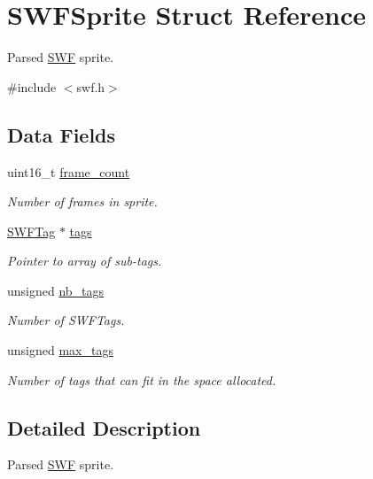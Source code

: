 \hypertarget{struct_s_w_f_sprite}{}\section{S\+W\+F\+Sprite Struct Reference}
\label{struct_s_w_f_sprite}


Parsed \hyperlink{struct_s_w_f}{S\+W\+F} sprite.  




{\ttfamily \#include $<$swf.\+h$>$}

\subsection*{Data Fields}
\begin{DoxyCompactItemize}
\item 
uint16\+\_\+t \hyperlink{struct_s_w_f_sprite_a952578e82c9d1dad81bbb086cb8ec1c2}{frame\+\_\+count}
\begin{DoxyCompactList}\small\item\em Number of frames in sprite. \end{DoxyCompactList}\item 
\hyperlink{struct_s_w_f_tag}{S\+W\+F\+Tag} $\ast$ \hyperlink{struct_s_w_f_sprite_ade3a1182fa49e25d252ade80aac6f873}{tags}
\begin{DoxyCompactList}\small\item\em Pointer to array of sub-\/tags. \end{DoxyCompactList}\item 
unsigned \hyperlink{struct_s_w_f_sprite_a9eae389efaf36d5ebf4e1e31edf2f05e}{nb\+\_\+tags}
\begin{DoxyCompactList}\small\item\em Number of S\+W\+F\+Tags. \end{DoxyCompactList}\item 
unsigned \hyperlink{struct_s_w_f_sprite_a508a2dc2cceb78be54bf2c40a1665236}{max\+\_\+tags}
\begin{DoxyCompactList}\small\item\em Number of tags that can fit in the space allocated. \end{DoxyCompactList}\end{DoxyCompactItemize}


\subsection{Detailed Description}
Parsed \hyperlink{struct_s_w_f}{S\+W\+F} sprite. 

